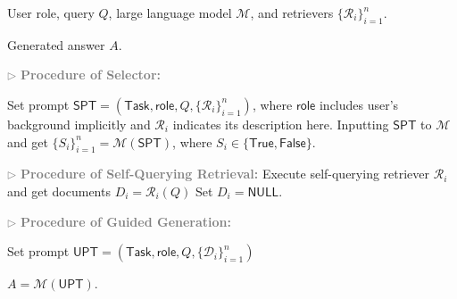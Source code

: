 \begin{algorithm}[t]
\caption{\iotrgen}\label{alg:iotrgen}
\begin{algorithmic}[1]
\REQUIRE
User \textsf{role}, query $Q$, large language model $\mathcal{M}$, and retrievers $\{\mathcal{R}_i\}_{i=1}^n$.

\ENSURE
Generated answer $A$.

\STATE
\textcolor{gray}{$\triangleright$ \textbf{Procedure of Selector:}}

\STATE
Set prompt $\mathsf{SPT} = (\mathsf{Task}, \mathsf{role}, Q, \{\mathcal{R}_i\}_{i=1}^n)$, where $\mathsf{role}$ includes user's background implicitly and $\mathcal{R}_i$ indicates its description here.
\STATE
Inputting $\mathsf{SPT}$ to $\mathcal{M}$ and get $\{S_i\}_{i=1}^n = \mathcal{M}(\mathsf{SPT})$, where $S_i\in \{\mathsf{True}, \mathsf{False}\}$.

\STATE 
\textcolor{gray}{$\triangleright$ \textbf{Procedure of Self-Querying Retrieval:}}
\STATE
Execute self-querying retriever $\mathcal{R}_i$ and get documents $D_i=\mathcal{R}_i(Q)$
\ELSE
\STATE
Set $D_i = \mathsf{NULL}$.
\ENDIF
\ENDFOR

\STATE
\textcolor{gray}{$\triangleright$ \textbf{Procedure of Guided Generation:}}

\STATE
Set prompt $\mathsf{UPT} = (\mathsf{Task}, \mathsf{role}, Q, \{\mathcal{D}_i\}_{i=1}^n)$

\RETURN
$A = \mathcal{M}(\mathsf{UPT})$.


\end{algorithmic}
\end{algorithm}